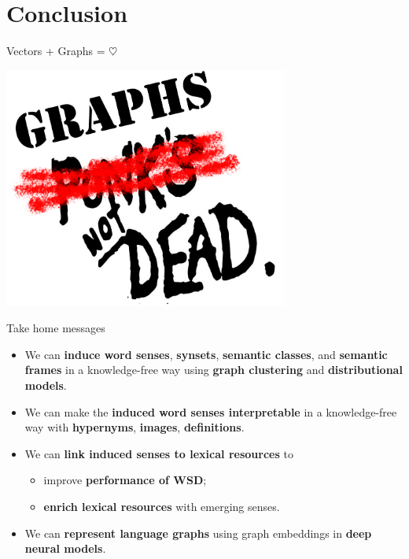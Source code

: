 
\section{Conclusion}


\begin{frame}{Vectors + Graphs = $\heartsuit$ }

\begin{center}
\includegraphics[width=0.7\textwidth]{figures/graphs}	
\end{center}

\end{frame}

\begin{frame}{Take home messages}

\begin{itemize}
	\item We can \alert{\textbf{induce word senses}}, \alert{\textbf{synsets}}, \alert{\textbf{semantic classes}}, and \textbf{\alert{semantic frames}} in a knowledge-free way using \textbf{graph clustering} and \textbf{distributional models}.
    \vspace{1em}
    \pause
    
	\item We can make the \alert{\textbf{induced word senses interpretable}} in a knowledge-free way with \textbf{hypernyms}, \textbf{images},  \textbf{definitions}. 
	\vspace{1em}
    \pause
	
	\item We can \alert{\textbf{link induced senses to lexical resources}} to
	\begin{itemize} 
		\item improve \textbf{performance of WSD};
		\item \textbf{enrich lexical resources} with emerging senses.
	\end{itemize}
	
	\pause 
	\item We can \textbf{\alert{represent language graphs}} using graph embeddings in \textbf{deep neural models}.
	
\end{itemize}


\end{frame}



